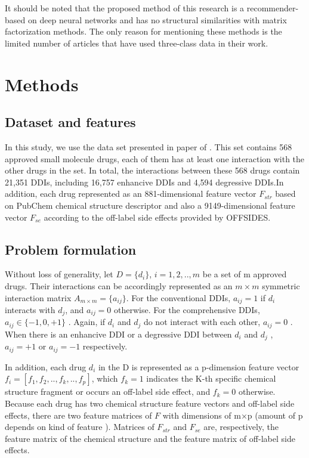 \documentclass{bmcart}
\begin{document}
It should be noted that the proposed method of this research is a recommender-based on deep neural networks and has no structural similarities with matrix factorization methods. The only reason for mentioning these methods is the limited number of articles that have used three-class data in their work.

\section*{Methods}
\subsection*{Dataset and features}
In this study, we use the data set presented in paper of \cite{yu2018predicting}. This set contains 568 approved small molecule drugs, each of them has at least one interaction with the other drugs in the set. In total, the interactions between these 568 drugs contain 21,351 DDIs, including 16,757 enhancive DDIs and 4,594 degressive DDIs.In addition, each drug represented as an  881-dimensional feature vector $ F_ {str} $  based on PubChem chemical structure descriptor and also a 9149-dimensional feature vector $ F_ {se} $ according to the off-label side effects provided by OFFSIDES.

\subsection*{Problem formulation}

Without loss of generality, let $D = \{d_i\}$, $i = 1, 2, .., m$ be a set of m approved drugs. Their  interactions can be accordingly represented as an $m \times m$ symmetric interaction matrix $A_{m \times m} = \{a_{ij}\}$. For the conventional DDIs, $a_{ij} = 1$ if $d_i$ interacts with $d_j$, and $a_{ij} = 0$ otherwise. For the comprehensive DDIs, $a_{ij} ∈ \{−1, 0, +1\}$ . Again, if $d_i$ and $d_j$ do not interact with each other, $a_{ij} = 0$ . When there is an enhancive DDI or a degressive DDI between $d_i$ and $d_j$ , $a_{ij} = +1$ or $a_{ij} = −1$ respectively.

In addition, each drug $d_i$ in the D is represented as a p-dimension feature vector $f_i = \left[  f_1, f_2, .., f_k, .., f_p \right]$, which $f_k = 1$ indicates the K-th specific chemical structure fragment or occurs an off-label side effect, and $f_k = 0$ otherwise. Because each drug has two chemical structure feature vectors and off-label side effects, there are two feature matrices of $F$ with dimensions of m×p (amount of p depends on kind of feature ). Matrices of $F_{str}$ and $F_{se}$ are, respectively, the feature matrix of the chemical structure and the feature matrix of off-label side effects.
\end{document}
